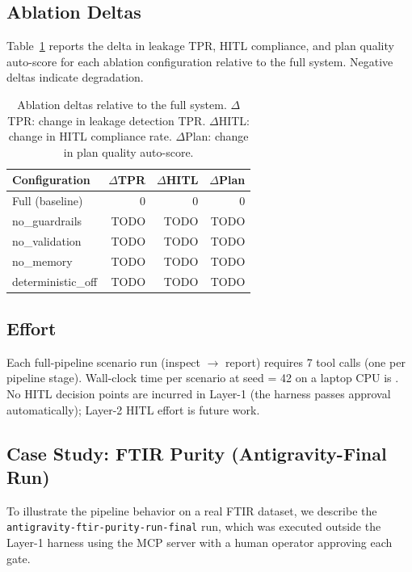 \subsection{Ablation Deltas}
\label{sec:ablation}

Table~\ref{tab:ablation} reports the delta in leakage TPR, HITL compliance,
and plan quality auto-score for each ablation configuration relative to the
full system.
Negative deltas indicate degradation.

\begin{table}[ht]
  \centering
  \caption{Ablation deltas relative to the full system.
    $\Delta$TPR: change in leakage detection TPR.
    $\Delta$HITL: change in HITL compliance rate.
    $\Delta$Plan: change in plan quality auto-score.}
  \label{tab:ablation}
  \begin{tabular}{lrrr}
    \toprule
    Configuration       & $\Delta$TPR & $\Delta$HITL & $\Delta$Plan \\
    \midrule
    Full (baseline)     & 0 & 0 & 0 \\
    no\_guardrails      & TODO & TODO & TODO \\
    no\_validation      & TODO & TODO & TODO \\
    no\_memory          & TODO & TODO & TODO \\
    deterministic\_off  & TODO & TODO & TODO \\
    \bottomrule
  \end{tabular}
\end{table}

\subsection{Effort}
\label{sec:effort}

Each full-pipeline scenario run (inspect $\to$ report) requires 7 tool calls
(one per pipeline stage).
Wall-clock time per scenario at seed = 42 on a laptop CPU is
.
No HITL decision points are incurred in Layer-1 (the harness passes approval
automatically); Layer-2 HITL effort is future work.

\subsection{Case Study: FTIR Purity (Antigravity-Final Run)}
\label{sec:casestudy}

To illustrate the pipeline behavior on a real FTIR dataset, we describe the
\texttt{antigravity-ftir-purity-run-final} run, which was executed outside the
Layer-1 harness using the MCP server with a human operator approving each gate.


